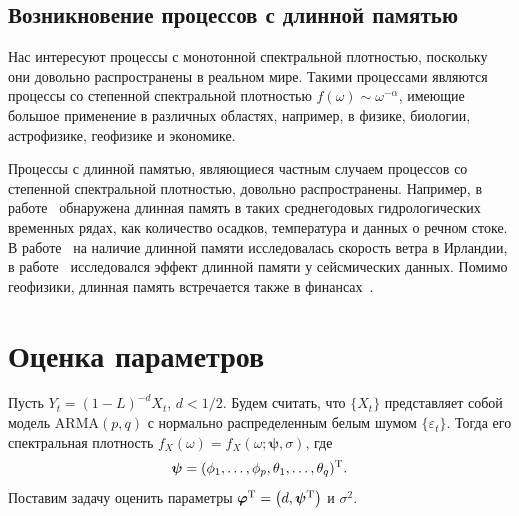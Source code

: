 \documentclass[specialist,
substylefile = spbu_report.rtx,
subf,href,colorlinks=true, 12pt]{disser}
\theoremstyle{definition}
\newtheorem{example}{Пример}[section]
\newcommand{\im}{\mathrm{i}}
\begin{document}

\subsection{Возникновение процессов с длинной памятью}
Нас интересуют процессы с монотонной спектральной плотностью, поскольку они довольно распространены в реальном мире. Такими процессами являются процессы со степенной спектральной плотностью $f(\omega)\sim \omega^{-\alpha}$, имеющие большое применение в различных областях, например, в физике, биологии, астрофизике, геофизике и экономике.

Процессы с длинной памятью, являющиеся частным случаем процессов со степенной спектральной плотностью, довольно распространены. Например, в работе~\cite{Hipel1994} обнаружена длинная память в таких среднегодовых гидрологических временных рядах, как количество осадков, температура и данных о речном стоке. В работе~\cite{Haslett1989} на наличие длинной памяти исследовалась скорость ветра в Ирландии, в работе~\cite{Mariani2020} исследовался эффект длинной памяти у сейсмических данных. Помимо геофизики, длинная память встречается также в финансах~\cite{Barkoulas1997,Guglielmo2019}.

\section{Оценка параметров}
Пусть $Y_t=(1-L)^{-d}X_t$, $d<1/2$. Будем считать, что $\{X_t\}$ представляет собой модель $\mathrm{ARMA}(p, q)$ с нормально распределенным белым шумом $\{\varepsilon_t\}$. Тогда его спектральная плотность $f_X(\omega)=f_X(\omega; \bm\psi, \sigma)$, где
\[
	\bm\psi=(\phi_1,\ldots,\phi_p,\theta_1,\ldots,\theta_q)^{\mathrm{T}}.
\]
Поставим задачу оценить параметры $\bm\varphi^{\mathrm{T}}=\left(d, \bm\psi^{\mathrm{T}}\right)$ и $\sigma^2$.
\end{document}
